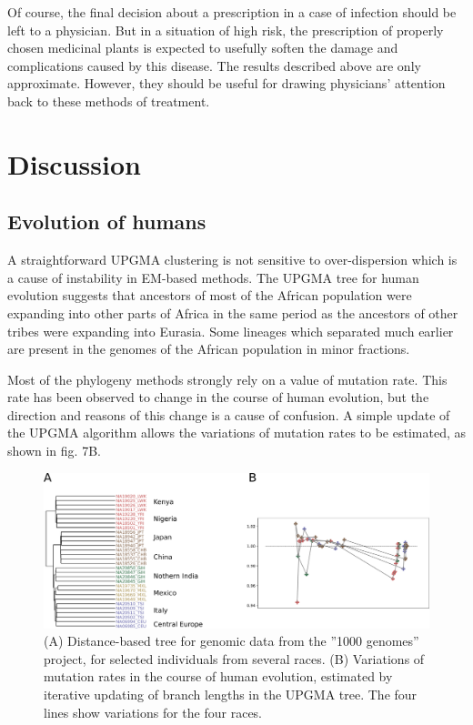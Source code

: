 \documentclass[12pt,aps]{revtex4}
\begin{document}
Of course, the final decision about a prescription in a case of
infection should be left to a physician. But in a situation of high
risk, the prescription of properly chosen medicinal plants is expected
to usefully soften the damage and complications caused by this
disease. The results described above are only approximate. However,
they should be useful for drawing physicians’ attention back to these
methods of treatment.

\section{Discussion}

\subsection{Evolution of humans}

A straightforward UPGMA clustering is not sensitive to over-dispersion which is a
cause of instability in EM-based methods. The UPGMA tree for human evolution
suggests that ancestors of most of the African population were expanding into other
parts of Africa in the same period as the ancestors of other tribes were expanding
into Eurasia. Some lineages which separated much earlier are present in the genomes
of the African population in minor fractions.

Most of the phylogeny methods strongly rely on a value of mutation rate. This rate
has been observed to change in the course of human evolution, but the direction and
reasons of this change is a cause of confusion. A simple update of the UPGMA
algorithm allows the variations of mutation rates to be estimated, as shown in fig.
7B.

\begin{figure}[h]
\centerline{\includegraphics[width=0.95\columnwidth]{fig_evol.png}}%
\caption{(A) Distance-based tree for genomic data from the ”1000 genomes” project,
for selected individuals from several races. (B) Variations of mutation rates in the
course of human evolution, estimated by iterative updating of branch lengths in the
UPGMA tree. The four lines show variations for the four races.}
\label{fig_evol}
\end{figure}
\end{document}
